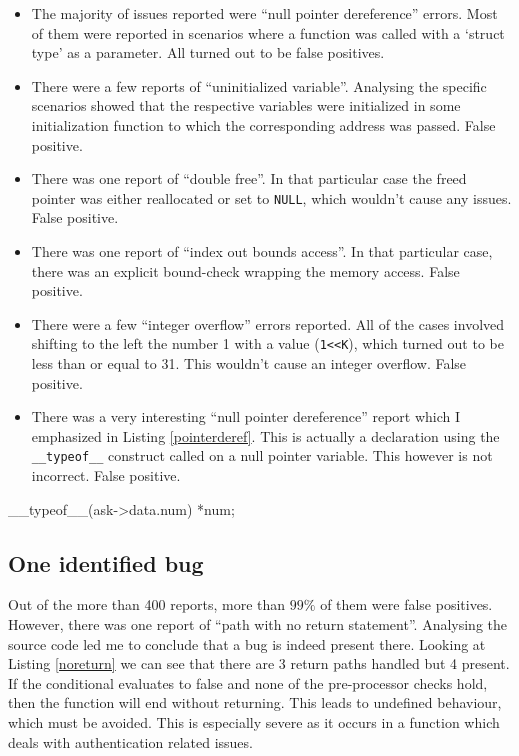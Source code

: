 \documentclass[a4paper,10pt,twocolumn,english]{article}
\begin{document}
\begin{itemize}
\setlength\itemsep{0em}
\setlength\parsep{0em}
    \item The majority of issues reported were ``null pointer dereference''
        errors. Most of them were reported in scenarios where a function was
        called with a `struct type' as a parameter. All turned out to be false
        positives. 
    \item There were a few reports of ``uninitialized variable''. Analysing the
        specific scenarios showed that the respective variables were
        initialized in some initialization function to which the corresponding
        address was passed. False positive.
    \item There was one report of ``double free''. In that particular case the
        freed pointer was either reallocated or set to \lstinline{NULL}, which
        wouldn't cause any issues. False positive.
    \item There was one report of ``index out bounds access''. In that
        particular case, there was an explicit bound-check wrapping the memory
        access. False positive.
    \item There were a few ``integer overflow'' errors reported. All of the
        cases involved shifting to the left the number 1 with a value
        (\lstinline{1<<K}), which turned out to be less than or equal to 31.
        This wouldn't cause an integer overflow. False positive.
    \item There was a very interesting ``null pointer dereference'' report
        which I emphasized in Listing \ref{pointerderef}. This is actually a
        declaration using the \lstinline{__typeof__} construct called on a null
        pointer variable. This however is not incorrect. False positive.

\end{itemize}

\begin{code}[basicstyle=\ttfamily\small, language=c,
    caption=Declaration using \_\_typeof\_\_, label=pointerderef]
    __typeof__(ask->data.num) *num;
\end{code}

\subsection{One identified bug}

Out of the more than 400 reports, more than $99\%$ of them were false
positives. However, there was one report of ``path with no return statement''.
Analysing the source code led me to conclude that a bug is indeed present
there. Looking at Listing \ref{noreturn} we can see that there are 3 return
paths handled but 4 present. If the conditional evaluates to false and none of
the pre-processor checks hold, then the function will end without returning.
This leads to undefined behaviour, which must be avoided. This is especially
severe as it occurs in a function which deals with authentication related
issues.
\end{document}
